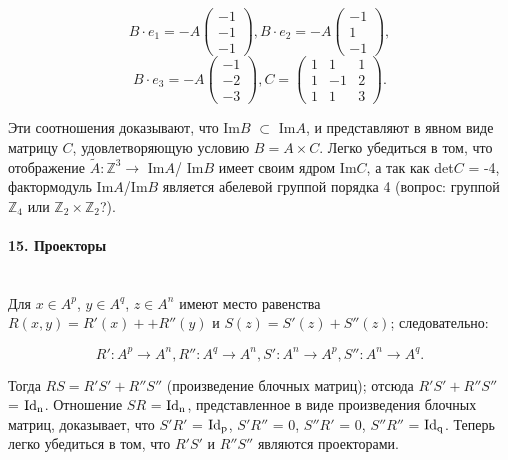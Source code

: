 \documentclass{mai_book}
\begin{document}
{\begin{equation*}
B \cdot e_{1} = -A \begin{pmatrix} -1 \\ -1 \\ -1 \end{pmatrix}, B \cdot e_{2} = -A \begin{pmatrix} -1 \\ 1 \\ -1 \end{pmatrix},
\end{equation*}
\begin{equation*}
B \cdot e_{3} = -A \begin{pmatrix} -1 \\ -2 \\ -3 \end{pmatrix}, C = \begin{pmatrix} 1 & 1 & 1 \\ 1 & -1 & 2 \\ 1 & 1 & 3 \end{pmatrix}.
\end{equation*}

\noindent Эти соотношения доказывают, что Im{$B$} $\subset$ Im{$A$}, и представляют в явном виде матрицу $C$, удовлетворяющую условию $B = A \times C$. Легко убедиться в том, что отображение $\tilde{A} : \mathbb {Z}^3 \rightarrow$ Im{$A$}/ Im{$B$} имеет своим ядром Im{$C$}, а так как det{$C$} = -4, фактормодуль Im{$A$}/Im{$B$} является абелевой группой порядка 4 (вопрос: группой $\mathbb {Z}_{4}$ или $\mathbb {Z}_2 \times \mathbb {Z}_2$?).




\paragraph{15. Проекторы} \mbox{}\\

Для $x \in A^{p}$, $y \in A^{q}$, $z \in A^{n}$ имеют место равенства $R(x, y) = R'(x)+
+R''(y)$ и $S(z) = S'(z) + S''(z)$; следовательно:

\begin{equation*}
R' : A^{p} \rightarrow A^{n}, R'' : A^{q} \rightarrow A^{n}, S' : A^{n} \rightarrow A^{p}, S'' : A^{n} \rightarrow A^{q}.
\end{equation*}

\noindent Тогда $RS = R'S' + R''S''$ (произведение блочных матриц); отсюда
$R'S' + R''S''$ = $\rm{Id}_{n}$. Отношение $SR$ = $\rm{Id}_{n}$, представленное в виде произведения блочных матриц, доказывает, что $S'R'$ = $\rm{Id}_{p}$, $S'R''$ = 0,
$S''R'$ = 0, $S''R''$ = $\rm{Id}_{q}$. Теперь легко убедиться в том, что $R'S'$ и $R''S''$
являются проекторами.

}
\end{document}
